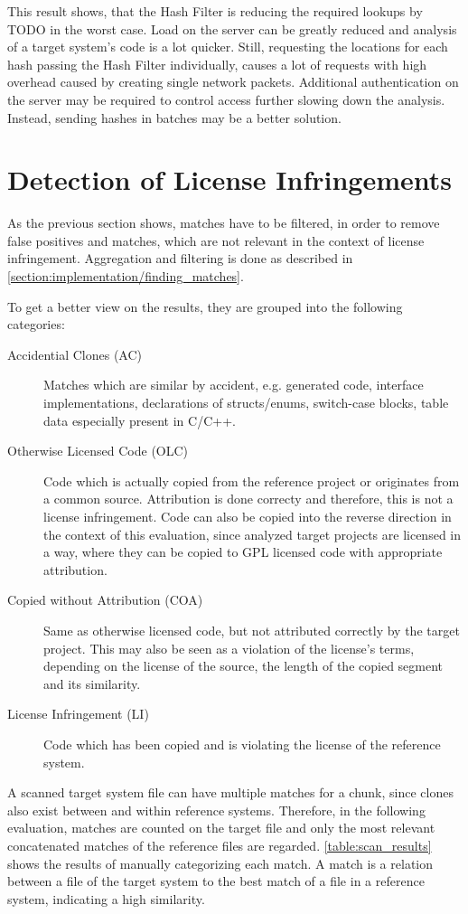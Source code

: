 This result shows, that the Hash Filter is reducing the required lookups by TODO in the worst case.
Load on the server can be greatly reduced and analysis of a target system's code is a lot quicker.
Still, requesting the locations for each hash passing the Hash Filter individually, causes a lot of requests with high overhead caused by creating single network packets.
Additional authentication on the server may be required to control access further slowing down the analysis.
Instead, sending hashes in batches may be a better solution.

\section{Detection of License Infringements}
As the previous section shows, matches have to be filtered, in order to remove false positives and matches, which are not relevant in the context of license infringement.
Aggregation and filtering is done as described in \autoref{section:implementation/finding_matches}.

To get a better view on the results, they are grouped into the following categories:
\begin{description}
	\item [Accidential Clones (AC)]
		Matches which are similar by \glqq accident\grqq, e.g. generated code, interface implementations, declarations of structs/enums, switch-case blocks, table data especially present in C/C++.
	\item[Otherwise Licensed Code (OLC)]
		Code which is actually copied from the reference project or originates from a common source.
		Attribution is done correcty and therefore, this is not a license infringement.
		Code can also be copied into the reverse direction in the context of this evaluation, since analyzed target projects are licensed in a way, where they can be copied to GPL licensed code with appropriate attribution.
	\item[Copied without Attribution (COA)] 
		Same as otherwise licensed code, but not attributed correctly by the target project.
		This may also be seen as a violation of the license's terms, depending on the license of the source, the length of the copied segment and its similarity.
	\item[License Infringement (LI)]
		Code which has been copied and is violating the license of the reference system.
\end{description}

A scanned target system file can have multiple matches for a chunk, since clones also exist between and within reference systems.
Therefore, in the following evaluation, matches are counted on the target file and only the most relevant concatenated matches of the reference files are regarded.
\autoref{table:scan_results} shows the results of manually categorizing each match.
A match is a relation between a file of the target system to the best match of a file in a reference system, indicating a high similarity.

